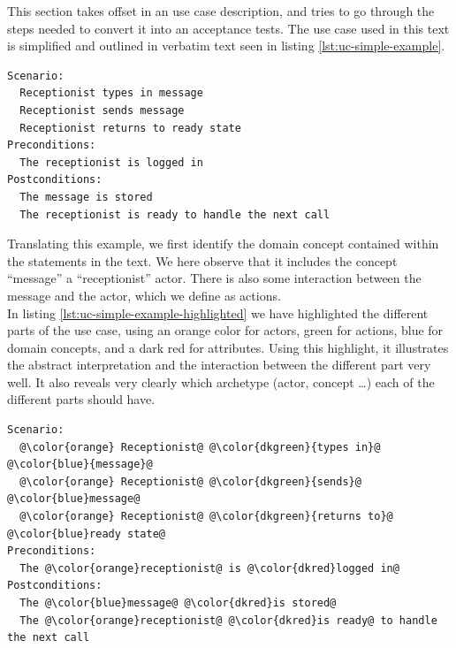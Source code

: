 This section takes offset in an use case description, and tries to go through the steps needed to convert it into an acceptance tests. The use case used in this text is simplified and outlined in verbatim text seen in listing \ref{lst:uc-simple-example}.
\begin{lstlisting}[frame=single,style=usecase, caption=Use case example, label=lst:uc-simple-example]
Scenario:
  Receptionist types in message
  Receptionist sends message
  Receptionist returns to ready state
Preconditions:
  The receptionist is logged in
Postconditions:
  The message is stored
  The receptionist is ready to handle the next call
\end{lstlisting} 
Translating this example, we first identify the domain concept contained within the statements in the text. We here observe that it includes the concept ``message'' a ``receptionist'' actor. There is also some interaction between the message and the actor, which we define as actions.\\
In listing \ref{lst:uc-simple-example-highlighted} we have highlighted the different parts of the use case, using an orange color for actors, green for actions, blue for domain concepts, and a dark red for attributes. Using this highlight, it illustrates the abstract interpretation and the interaction between the different part very well. It also reveals very clearly which archetype (actor, concept \dots) each of the different parts should have. 
\begin{lstlisting}[frame=single,style=usecase, caption=Use case example with its different parts highlighted, label=lst:uc-simple-example-highlighted]
Scenario:
  @\color{orange} Receptionist@ @\color{dkgreen}{types in}@ @\color{blue}{message}@
  @\color{orange} Receptionist@ @\color{dkgreen}{sends}@ @\color{blue}message@
  @\color{orange} Receptionist@ @\color{dkgreen}{returns to}@ @\color{blue}ready state@
Preconditions:
  The @\color{orange}receptionist@ is @\color{dkred}logged in@
Postconditions:
  The @\color{blue}message@ @\color{dkred}is stored@
  The @\color{orange}receptionist@ @\color{dkred}is ready@ to handle the next call
\end{lstlisting} 

